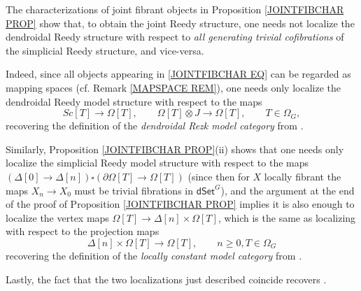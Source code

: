 \documentclass[a4paper,10pt
 ,draft
]{article}%
\begin{document}
\begin{remark}\label{RECOVDEF REM}
The characterizations of joint fibrant objects in Proposition \ref{JOINTFIBCHAR PROP} show that, to obtain the joint Reedy structure, 
one needs not localize the dendroidal Reedy structure with respect to \emph{all generating trivial cofibrations}
of the simplicial Reedy structure, and vice-versa. 

Indeed, since all objects appearing in 
\eqref{JOINTFIBCHAR EQ}
can be regarded as mapping spaces (cf. Remark \ref{MAPSPACE REM}), 
one needs only localize the dendroidal Reedy model structure with respect to the maps
\[
Sc[T] \to \Omega[T], \qquad \Omega[T] \otimes J \to \Omega[T], \qquad T \in \Omega_G,
\]
recovering 
the definition of the \emph{dendroidal Rezk model category} %
from \cite[Defs. 5.4 and 6.2]{CM13a}.

Similarly, Proposition \ref{JOINTFIBCHAR PROP}(ii) shows that one needs only localize the simplicial Reedy model structure with respect to the maps
$(\Delta[0] \to \Delta[n])\square (\partial \Omega[T] \to \Omega[T])$ (since then for $X$ locally fibrant the maps $X_n \to X_0$ must be trivial fibrations in $\mathsf{dSet}^G$), and the argument at the end of the proof of Proposition \ref{JOINTFIBCHAR PROP}
implies it is also enough to localize the vertex maps 
$\Omega[T] \to \Delta[n] \times \Omega[T]$, which is the same as localizing with respect to the projection maps
\[\Delta[n] \times \Omega[T] \to \Omega[T],
\qquad n\geq 0, T \in \Omega_G\]
recovering
the definition of the \emph{locally constant model category} %
from \cite[Def. 4.6]{CM13a}.

Lastly, the fact that the two localizations just described coincide recovers \cite[Thm. 6.6]{CM13a}.
\end{remark}
\end{document}
